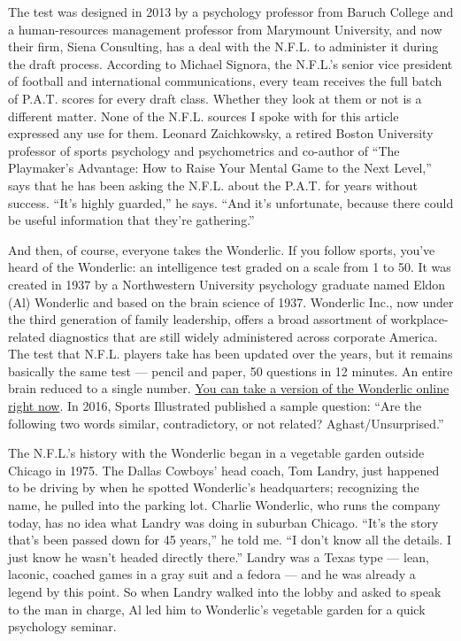 The test was designed in 2013 by a psychology professor from Baruch
College and a human-resources management professor from Marymount
University, and now their firm, Siena Consulting, has a deal with the
N.F.L. to administer it during the draft process. According to Michael
Signora, the N.F.L.'s senior vice president of football and
international communications, every team receives the full batch of
P.A.T. scores for every draft class. Whether they look at them or not is
a different matter. None of the N.F.L. sources I spoke with for this
article expressed any use for them. Leonard Zaichkowsky, a retired
Boston University professor of sports psychology and psychometrics and
co-author of ``The Playmaker's Advantage: How to Raise Your Mental Game
to the Next Level,'' says that he has been asking the N.F.L. about the
P.A.T. for years without success. ``It's highly guarded,'' he says.
``And it's unfortunate, because there could be useful information that
they're gathering.''

And then, of course, everyone takes the Wonderlic. If you follow sports,
you've heard of the Wonderlic: an intelligence test graded on a scale
from 1 to 50. It was created in 1937 by a Northwestern University
psychology graduate named Eldon (Al) Wonderlic and based on the brain
science of 1937. Wonderlic Inc., now under the third generation of
family leadership, offers a broad assortment of workplace-related
diagnostics that are still widely administered across corporate America.
The test that N.F.L. players take has been updated over the years, but
it remains basically the same test --- pencil and paper, 50 questions in
12 minutes. An entire brain reduced to a single number.
\href{https://beatthewonderlic.com/take-a-free-wonderlic-test-online/}{You
can take a version of the Wonderlic online right now}. In 2016, Sports
Illustrated published a sample question: ``Are the following two words
similar, contradictory, or not related? Aghast/Unsurprised.''

The N.F.L.'s history with the Wonderlic began in a vegetable garden
outside Chicago in 1975. The Dallas Cowboys' head coach, Tom Landry,
just happened to be driving by when he spotted Wonderlic's headquarters;
recognizing the name, he pulled into the parking lot. Charlie Wonderlic,
who runs the company today, has no idea what Landry was doing in
suburban Chicago. ``It's the story that's been passed down for 45
years,'' he told me. ``I don't know all the details. I just know he
wasn't headed directly there.'' Landry was a Texas type --- lean,
laconic, coached games in a gray suit and a fedora --- and he was
already a legend by this point. So when Landry walked into the lobby and
asked to speak to the man in charge, Al led him to Wonderlic's vegetable
garden for a quick psychology seminar.


